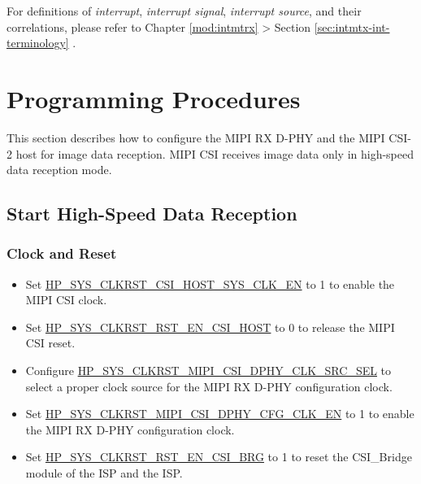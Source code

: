\documentclass[main\_\_EN.tex]{subfiles}
\begin{document}
\begin{tiplisting}
For definitions of \textit{interrupt}, \textit{interrupt signal}, \textit{interrupt source}, and their correlations, please refer to Chapter \ref{mod:intmtrx} \textit{} > Section \ref{sec:intmtx-int-terminology} \textit{}.
\end{tiplisting}



\section{Programming Procedures}
\label{sec:mipicsi-prog-procedures}

This section describes how to configure the MIPI RX D-PHY and the MIPI CSI-2 host for image data reception. MIPI CSI receives image data only in high-speed data reception mode.

\subsection{Start High-Speed Data Reception}

\subsubsection{Clock and Reset}
\begin{itemize}
    \item Set \hyperref[fielddesc:HPSYSCLKRSTCSIHOSTSYSCLKEN]{HP\_SYS\_CLKRST\_CSI\_HOST\_SYS\_CLK\_EN} to 1 to enable the MIPI CSI clock.
    \item Set \hyperref[fielddesc:HPSYSCLKRSTRSTENCSIHOST]{HP\_SYS\_CLKRST\_RST\_EN\_CSI\_HOST} to 0 to release the MIPI CSI reset.
    \item Configure \hyperref[fielddesc:HPSYSCLKRSTMIPICSIDPHYCLKSRCSEL]{HP\_SYS\_CLKRST\_MIPI\_CSI\_DPHY\_CLK\_SRC\_SEL} to select a proper clock source for the MIPI RX D-PHY configuration clock.
    \item Set \hyperref[fielddesc:HPSYSCLKRSTMIPICSIDPHYCFGCLKEN]{HP\_SYS\_CLKRST\_MIPI\_CSI\_DPHY\_CFG\_CLK\_EN} to 1 to enable the MIPI RX D-PHY configuration clock.
    \item Set \hyperref[fielddesc:HPSYSCLKRSTRSTENCSIBRG]{HP\_SYS\_CLKRST\_RST\_EN\_CSI\_BRG} to 1 to reset the CSI\_Bridge module of the ISP and the ISP.
\end{itemize}
\end{document}
